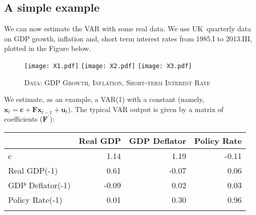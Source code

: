 \documentclass[11pt,a4paper]{report}
\numberwithin{equation}{chapter}
\numberwithin{section}{chapter}
\begin{document}
\subsection{A simple example}

We can now estimate the VAR with some real data. We use UK\ quarterly data
on GDP growth, inflation and, short term interest rates from 1985.I to
2013.III, plotted in the Figure below.

\begin{figure}[!ht]\vspace{.1cm}
\centering
\begin{minipage}[b]{0.99\textwidth}%
\texttt{[image: X1.pdf]}
\texttt{[image: X2.pdf]}
\texttt{[image: X3.pdf]}
\vspace{.3cm}%
\caption{ {\scshape Data: GDP Growth, Inflation, Short-term Interest Rate}}%
\end{minipage}
\end{figure}%

\noindent We estimate, as an example, a VAR(1) with a constant (namely, $%
\mathbf{x}_{t}=\mathbf{c}+\mathbf{Fx}_{t-1}+\mathbf{u}_{t}$). The typical
VAR output is given by a matrix of coefficients ($\mathbf{F}^{\prime }$):

\begin{center}
\begin{tabular}{lrrr}
\addlinespace \toprule & Real GDP & GDP Deflator & Policy Rate \\ 
\midrule c & 1.14 & 1.19 & -0.11 \\ 
Real GDP(-1) & 0.61 & -0.07 & 0.06 \\ 
GDP Deflator(-1) & -0.09 & 0.02 & 0.03 \\ 
Policy Rate(-1) & 0.01 & 0.30 & 0.96 \\ 
\bottomrule &  &  & 
\end{tabular}%
\end{center}
\end{document}
